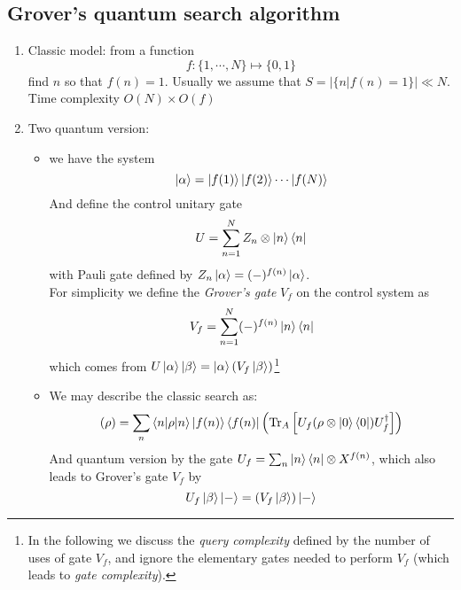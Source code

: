 \documentclass[11pt,a4paper]{article}%
\numberwithin{equation}{section}
\newcommand{\Tr}{\operatorname{Tr}}
\begin{document}
\subsection{Grover's quantum search algorithm} %
\label{sub:quantum_search}
\begin{enumerate}
    \item Classic model: from a function 
    \begin{equation}
        f:\{1,\cdots,N\}\mapsto\{0,1\}
    \end{equation}
    find $n$ so that $f(n) = 1$. Usually we assume that $S = |\{n|f(n)=1\}|\ll N$. Time complexity $O(N)\times O(f)$
    \item Two quantum version: 
    \begin{itemize}
        \item we have the system
        \begin{equation}
            \ket\alpha = \ket{f(1)}\ket{f(2)}\cdots\ket{f(N)}
        \end{equation}
        And define the control unitary gate
        \begin{equation}
            U = \sum_{n=1}^NZ_n\otimes\ket n\bra n 
        \end{equation}
        with Pauli gate defined by $Z_n\ket\alpha = (-)^{f(n)}\ket\alpha$. \\
        For simplicity we define the \emph{Grover's gate} $V_f$ on the control system as
        \begin{equation}
            V_f = \sum_{n=1}^N(-)^{f(n)}\ket n\bra n
        \end{equation}
        which comes from $U\ket\alpha\ket\beta = \ket\alpha(V_f\ket\beta)$\footnote{In the following we discuss the \emph{query complexity} defined by the number of uses of gate $V_f$, and ignore the elementary gates needed to perform $V_f$ (which leads to \emph{gate complexity}).}
        \item We may describe the classic search as:
        \begin{equation}
            \mathscr (\rho) = \sum_n\braket{n|\rho|n}\ket{f(n)}\bra{f(n)} \left( \Tr_A\left[U_f(\rho\otimes\ket0\bra0)U_f^\dagger\right]\right)
        \end{equation}
        And quantum version by the gate $U_f = \sum_n\ket n\bra n\otimes X^{f(n)}$, which also leads to Grover's gate $V_f$ by
        \begin{equation}
            U_f\ket\beta\ket- = (V_f\ket\beta)\ket-
        \end{equation}

\end{itemize}
\end{enumerate}
\end{document}
